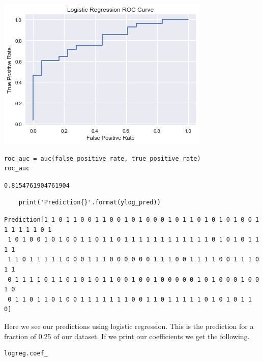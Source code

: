 \documentclass[11pt]{article}
\begin{document}
\begin{center}
\includegraphics[width=.9\linewidth]{obipy-resources/b207b8ecf66cdede2d5455fb7467ce47-17581ZrU.png}
\end{center}

\begin{verbatim}
roc_auc = auc(false_positive_rate, true_positive_rate)
roc_auc
\end{verbatim}

\begin{verbatim}
0.8154761904761904
\end{verbatim}



\begin{verbatim}
    print('Prediction{}'.format(ylog_pred))
\end{verbatim}

\begin{verbatim}
Prediction[1 1 0 1 1 0 0 1 1 0 0 1 0 1 0 0 0 1 0 1 1 0 1 0 1 0 1 0 0 1 1 1 1 1 1 0 1
 1 0 1 0 0 1 0 1 0 0 1 1 0 1 1 0 1 1 1 1 1 1 1 1 1 1 1 1 0 1 0 1 0 1 1 1 1
 1 1 0 1 1 1 1 1 0 0 0 1 1 1 0 0 0 0 0 0 1 1 1 0 0 1 1 1 1 0 0 1 1 1 0 1 1
 0 1 1 1 1 0 1 1 0 1 0 1 0 1 1 0 0 1 0 0 1 0 0 0 0 0 1 0 1 0 0 0 1 0 0 1 0
 0 1 1 0 1 1 0 1 0 0 1 1 1 1 1 1 1 0 0 1 1 0 1 1 1 1 1 0 1 0 1 0 1 1 0]

\end{verbatim}

Here we see our predictions using logistic regression. This is the prediction for a fraction of 0.25 of our dataset. If we print our coefficients we get the following. 

\begin{verbatim}
logreg.coef_
\end{verbatim}
\end{document}
